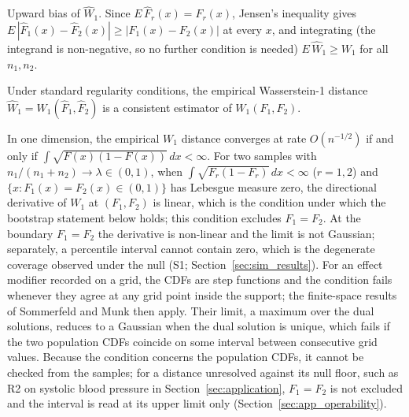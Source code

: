 \documentclass[AMA,Times1COL]{WileyNJDv5}
\begin{document}
Upward bias of $\widehat{W}_1$. Since $E\,\hat{F}_r(x) = F_r(x)$, Jensen's inequality gives $E\,|\hat{F}_1(x) - \hat{F}_2(x)| \geq |F_1(x) - F_2(x)|$ at every $x$, and integrating (the integrand is non-negative, so no further condition is needed) $E\,\widehat{W}_1 \geq W_1$ for all $n_1, n_2$.


Under standard regularity conditions, the empirical Wasserstein-1 distance $\widehat{W}_1 = W_1(\hat{F}_1, \hat{F}_2)$ is a consistent estimator of $W_1(F_1, F_2)$.\cite{delbarrio1999}

In one dimension, the empirical $W_1$ distance converges at rate $O(n^{-1/2})$ if and only if $\int \sqrt{F(x)(1-F(x))}\,dx < \infty$.\cite{delbarrio1999} For two samples with $n_1/(n_1+n_2) \to \lambda \in (0,1)$, when $\int \sqrt{F_r(1-F_r)}\,dx < \infty$ ($r = 1, 2$) and $\{x : F_1(x) = F_2(x) \in (0,1)\}$ has Lebesgue measure zero, the directional derivative of $W_1$ at $(F_1, F_2)$ is linear, which is the condition under which the bootstrap statement below holds;\cite{fang2019} this condition excludes $F_1 = F_2$. At the boundary $F_1 = F_2$ the derivative is non-linear and the limit is not Gaussian; separately, a percentile interval cannot contain zero, which is the degenerate coverage observed under the null (S1; Section~\ref{sec:sim_results}). For an effect modifier recorded on a grid, the CDFs are step functions and the condition fails whenever they agree at any grid point inside the support; the finite-space results of Sommerfeld and Munk then apply.\cite{sommerfeld2018} Their limit, a maximum over the dual solutions, reduces to a Gaussian when the dual solution is unique, which fails if the two population CDFs coincide on some interval between consecutive grid values. Because the condition concerns the population CDFs, it cannot be checked from the samples; for a distance unresolved against its null floor, such as R2 on systolic blood pressure in Section~\ref{sec:application}, $F_1 = F_2$ is not excluded and the interval is read at its upper limit only (Section~\ref{sec:app_operability}).
\end{document}
